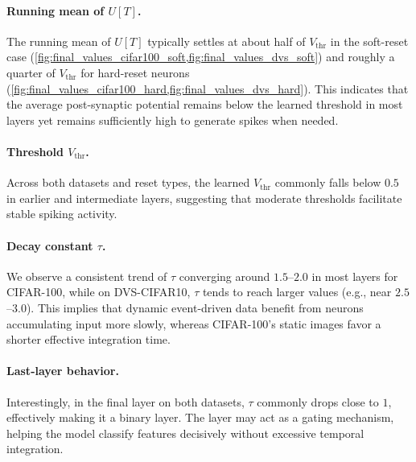 \paragraph{Running mean of $U[T]$.}
The running mean of $U[T]$ typically settles at about half of $V_{\text{thr}}$ in the soft-reset case (\cref{fig:final_values_cifar100_soft,fig:final_values_dvs_soft}) and roughly a quarter of $V_{\text{thr}}$ for hard-reset neurons (\cref{fig:final_values_cifar100_hard,fig:final_values_dvs_hard}). This indicates that the average post-synaptic potential remains below the learned threshold in most layers yet remains sufficiently high to generate spikes when needed.

\paragraph{Threshold $V_{\text{thr}}$.}
Across both datasets and reset types, the learned $V_{\text{thr}}$ commonly falls below $0.5$ in earlier and intermediate layers, suggesting that moderate thresholds facilitate stable spiking activity.

\paragraph{Decay constant $\tau$.}
We observe a consistent trend of $\tau$ converging around $1.5$--$2.0$ in most layers for CIFAR-100, while on DVS-CIFAR10, $\tau$ tends to reach larger values (e.g., near $2.5$--$3.0$). This implies that dynamic event-driven data benefit from neurons accumulating input more slowly, whereas CIFAR-100's static images favor a shorter effective integration time.

\paragraph{Last-layer behavior.}
Interestingly, in the final layer on both datasets, $\tau$ commonly drops close to $1$, effectively making it a binary layer. The layer may act as a gating mechanism, helping the model classify features decisively without excessive temporal integration.

